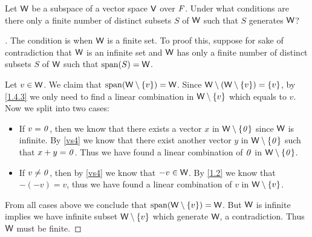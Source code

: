 \begin{ex}\label{ex:1.4.17}
  Let \(\mathsf{W}\) be a subspace of a vector space \(\mathsf{V}\) over \(\mathit{F}\).
  Under what conditions are there only a finite number of distinct subsets \(S\) of \(\mathsf{W}\) such that \(S\) generates \(\mathsf{W}\)?
\end{ex}

\begin{proof}[]
  The condition is when \(\mathsf{W}\) is a finite set.
  To proof this, suppose for sake of contradiction that \(\mathsf{W}\) is an infinite set and \(\mathsf{W}\) has only a finite number of distinct subsets \(S\) of \(\mathsf{W}\) such that \(\spn{S} = \W\).

  Let \(v \in \mathsf{W}\).
  We claim that \(\spn{\W \setminus \set{v}} = \W\).
  Since \(\mathsf{W} \setminus (\mathsf{W} \setminus \left\lbrace v\right\rbrace) = \left\lbrace v\right\rbrace\), by \cref{1.4.3} we only need to find a linear combination in \(\mathsf{W} \setminus \left\lbrace v\right\rbrace\) which equals to \(v\).
  Now we split into two cases:
  \begin{itemize}
    \item If \(v = \mathit{0}\), then we know that there exists a vector \(x\) in \(\mathsf{W} \setminus \left\lbrace\mathit{0}\right\rbrace\) since \(\mathsf{W}\) is infinite.
          By \ref{vs4} we know that there exist another vector \(y\) in \(\mathsf{W} \setminus \left\lbrace\mathit{0}\right\rbrace\) such that \(x + y = \mathit{0}\).
          Thus we have found a linear combination of \(\mathit{0}\) in \(\mathsf{W} \setminus \left\lbrace\mathit{0}\right\rbrace\).
    \item If \(v \neq \mathit{0}\), then by \ref{vs4} we know that \(-v \in \mathsf{W}\).
          By \cref{1.2} we know that \(-(-v) = v\), thus we have found a linear combination of \(v\) in \(\mathsf{W} \setminus \left\lbrace v\right\rbrace\).
  \end{itemize}
  From all cases above we conclude that \(\spn{\W \setminus \set{v}} = \W\).
  But \(\mathsf{W}\) is infinite implies we have infinite subset \(\mathsf{W} \setminus \left\lbrace v\right\rbrace\) which generate \(\mathsf{W}\), a contradiction.
  Thus \(\mathsf{W}\) must be finite.
\end{proof}
